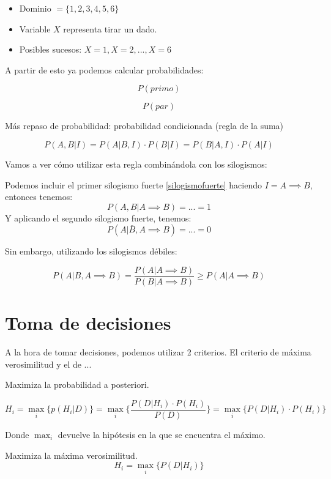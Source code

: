 \documentclass{apuntes}
\begin{document}
\begin{itemize}
	\item Dominio $= \{1,2,3,4,5,6\}$
	\item Variable $X$ representa tirar un dado.
	\item Posibles sucesos: $X=1,X=2,...,X=6$
\end{itemize}

A partir de esto ya podemos calcular probabilidades:

$$P\left(primo\right)$$

$$P\left(par\right)$$



Más repaso de probabilidad: probabilidad condicionada (regla de la suma)

\begin{defn}
\[P(A,B|I) = P(A|B,I) · P(B|I) = P(B|A,I) · P(A|I)\]
\end{defn}

Vamos a ver cómo utilizar esta regla combinándola con los silogismos:

Podemos incluir el primer silogismo fuerte \ref{silogismofuerte} haciendo $I= A\implies B$, entonces tenemos:
\[P(A,B|A\implies B) = ... = 1\]
Y aplicando el segundo silogismo fuerte, tenemos:
\[P(A|\bar{B}, A\implies B) = ... = 0\]

Sin embargo, utilizando los silogismos débiles:

\[ P(A|B,A\implies B) = \frac{P(A|A\implies B)}{P(B|A\implies B)} \geq P(A|A\implies B)\]


\section{Toma de decisiones}

A la hora de tomar decisiones, podemos utilizar 2 criterios. El criterio de máxima verosimilitud y el de ...


\begin{defn}
\label{CriterioMAP}
Maximiza la probabilidad a posteriori.

\[H_i = \max_i\{p(H_i | D)\} = \max_i \{\frac{P(D|H_i)·P(H_i)}{P(D)}\} = \max_i \{P(D|H_i)·P(H_i)\}\]

Donde $\max_i$ devuelve la hipótesis en la que se encuentra el máximo.
\end{defn}

\begin{defn}[Criterio MV]
\label{CriterioMV}
Maximiza la máxima verosimilitud.
\[
H_i = \max_i\{P(D|H_i)\}
\]

\end{defn}
\end{document}

